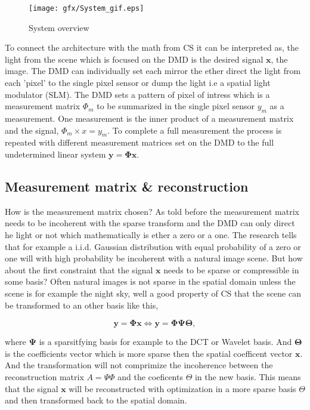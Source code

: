 \begin{figure}[H]
\texttt{[image: gfx/System\_gif.eps]}
	\caption{System overview}
	\label{fig:system_overview}
\end{figure}	

To connect the architecture with the math from CS it can be interpreted as, the light from the scene which is focused on the DMD is the desired signal $\mathbf{x}$, the image. The DMD can individually set each mirror the ether direct the light from each 'pixel' to the single pixel sensor or dump the light i.e a spatial light modulator (SLM). The DMD sets a pattern of pixel of intress which is a measurement matrix $\Phi_m$ to be summarized in the single pixel sensor $y_m$ as a measurement. One measurement is the inner product of a measurement matrix and the signal, $\Phi_m \times x = y_m$. To complete a full measurement the process is repeated with different measurement matrices set on the DMD to the full undetermined linear system $ \mathbf{y} = \mathbf{\Phi}\mathbf{x}$.

\subsection{Measurement matrix \& reconstruction}
How is the measurement matrix chosen? As told before the measurement matrix needs to be incoherent with the sparse transform and the DMD can only direct he light or not which mathematically is ether a zero or a one. The research tells that for example a i.i.d. Gaussian distribution with equal probability of a zero or one will with high probability be incoherent with a natural image scene. But how about the first constraint that the signal $\mathbf{x}$ needs to be sparse or compressible in some basis? Often natural images is not sparse in the spatial domain unless the scene is for example the night sky, well a good property of CS that the scene can be transformed to an other basis like this,

\begin{equation}
\label{eq:CS_1}
\mathbf{y} = \mathbf{\Phi} \mathbf{x} \Leftrightarrow \mathbf{y} = \mathbf{\Phi} \mathbf{\Psi} \mathbf{\Theta},
\end{equation}

where $\mathbf{\Psi}$ is a sparsitfying basis for example to the DCT or Wavelet basis. And $\mathbf{\Theta}$ is the coefficients vector which is more sparse then the spatial coefficent vector $\mathbf{x}$. And the transformation will not comprimize the incoherence between the reconstruction matrix $A = \Psi\Phi$ and the coeficents $\Theta$ in the new basis. This means that the signal $\mathbf{x}$ will be reconstructed with optimization in a more sparse basis $\Theta$ and then transformed back to the spatial domain.\\[0.1in]

